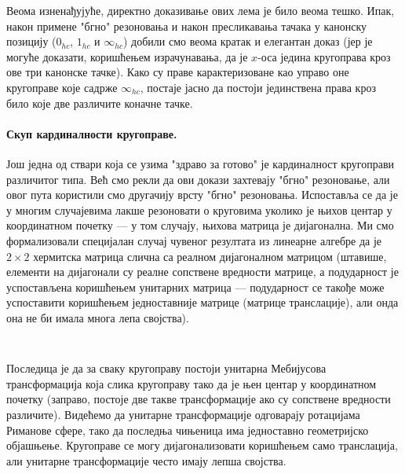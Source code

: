 \noindent Веома изненађујуће, директно доказивање ових лема је било
веома тешко. Ипак, након примене "бгно" резоновања и након
пресликавања тачака у канонску позицију ($0_{hc}$, $1_{hc}$ и
$\infty_{hc}$) добили смо веома кратак и елегантан доказ (јер је
могуће доказати, коришћењем израчунавања, да је $x$-оса једина
кругоправа кроз ове три канонске тачке). Како су праве карактеризоване
као управо оне кругоправе које садрже $\infty_{hc}$, постаје јасно да
постоји јединствена права кроз било које две различите коначне тачке.

\paragraph{Скуп кардиналности кругоправе.}
Још једна од ствари која се узима "здраво за готово" је кардиналност
кругоправи различитог типа. Већ смо рекли да ови докази захтевају
"бгно" резоновање, али овог пута користили смо другачију врсту "бгно"
резоновања. Испоставља се да је у многим случајевима лакше резоновати
о круговима уколико је њихов центар у координатном почетку --- у том
случају, њихова матрица је дијагонална.  Ми смо формализовали
специјалан случај чувеног резултата из линеарне алгебре да је
$2\times2$ хермитска матрица слична са реалном дијагоналном матрицом
(штавише, елементи на дијагонали су реалне сопствене вредности
матрице, а подударност је успостављена коришћењем унитарних матрица
--- подударност се такође може успоставити коришћењем једноставније
матрице (матрице транслације), али онда она не би имала многа лепа
својства).

{\tt
\begin{tabbing}
\hspace{5mm}\=\hspace{5mm}\=\hspace{5mm}\=\hspace{5mm}\=\hspace{5mm}\=\kill
\textbf{lemma} \textbf{assumes} "hermitean $H$"\\
\>\textbf{shows} "}$\exists\,k_1\,k_2\,M$. \=mat\_det $M$ $\neq 0$ $\wedge$ unitary $M$ $\wedge$\\
\>\>congruence $M$ $H$ = (cor $k_1$, 0, 0, cor $k_2$)"}
\end{tabbing}
}

Последица је да за сваку кругоправу постоји унитарна Мебијусова
трансформација која слика кругоправу тако да је њен центар у
координатном почетку (заправо, постоје две такве трансформације ако су
сопствене вредности различите). Видећемо да унитарне трансформације
одговарају ротацијама Риманове сфере, тако да последња чињеница има
једноставно геометријско објашњење. Кругоправе се могу
дијагонализовати коришћењем само транслација, али унитарне
трансформације често имају лепша својства.

